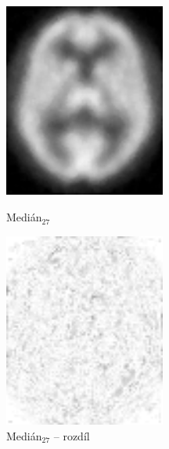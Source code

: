     \begin{figure}[h]
        \begin{minipage}[l]{0.5\textwidth}
            \center
            \includegraphics[width = 150pt]{src/8Appendix/final/10-100med.png}
            \caption{Medián$_{27}$}
        \end{minipage}
        \begin{minipage}[r]{0.5\textwidth}
            \center
            \includegraphics[width = 150pt]{src/8Appendix/final/10-100medD.png}
            \caption{Medián$_{27}$ -- rozdíl}
        \end{minipage}
     \end{figure}
     

